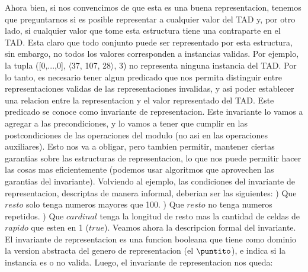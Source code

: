 \documentclass[10pt,a4paper]{article}
\begin{document}
Ahora bien, si nos convencimos de que esta es una buena representacion, tenemos que preguntarnos si es posible representar a cualquier valor del TAD  y, por otro lado, si cualquier valor que tome esta estructura tiene una contraparte en el TAD.
\newline
\newline
Esta claro que todo conjunto puede ser representado por esta estructura, sin embargo, no todos los valores corresponden a instancias validas. Por ejemplo, la tupla ([0,...,0], $\langle$37, 107, 28$\rangle$, 3) no representa ninguna instancia del TAD. Por lo tanto, es necesario tener algun predicado que nos permita distinguir entre representaciones validas de las representaciones invalidas, y asi poder establecer una relacion entre la representacion y el valor representado del TAD. Este predicado se conoce como invariante de representacion.
\newline
\newline
Este invariante lo vamos a agregar a las precondiciones, y lo vamos a tener que cumplir en las postcondiciones de las operaciones del modulo (no asi en las operaciones auxiliares). Esto nos va a obligar, pero tambien permitir, mantener ciertas garantias sobre las estructuras de representacion, lo que nos puede permitir hacer las cosas mas eficientemente (podemos usar algoritmos que aprovechen las garantias del invariante).
\newline
\newline
Volviendo al ejemplo, las condiciones del invariante de representacion, descriptas de manera informal, deberian ser las siguientes:
\newline
{}) Que $resto$ solo tenga numeros mayores que 100.
\newline
{}) Que $resto$ no tenga numeros repetidos.
\newline
{}) Que $cardinal$ tenga la longitud de resto mas la cantidad de celdas de $rapido$ que esten en 1 ($true$).
\newline
\newline
Veamos ahora la descripcion formal del invariante. El invariante de representacion es una funcion booleana que tiene como dominio la version abstracta del genero de representacion (el $\puntito$), e indica si la instancia es o no valida. Luego, el invariante de representacion nos queda:
\newline
{}
\end{document}
